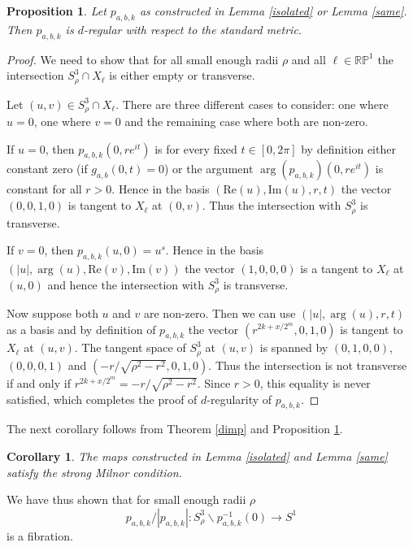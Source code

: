 \documentclass[notitlepage,12pt]{revtex4-1}
\newtheorem{corollary}[theorem]{\bf Corollary}
\newtheorem{proposition}[theorem]{\bf Proposition}
\begin{document}
\begin{proposition}
\label{trans}
Let $p_{a,b,k}$ as constructed in Lemma \ref{isolated} or Lemma \ref{same}. Then $p_{a,b,k}$ is $d$-regular with respect to the standard metric.
\end{proposition}

\begin{proof}
We need to show that for all small enough radii $\rho$ and all $\ell\in\mathbb{RP}^1$ the intersection $S^{3}_{\rho}\cap X_{\ell}$ is either empty or transverse.

Let $(u,v)\in S^{3}_{\rho}\cap X_{\ell}$. There are three different cases to consider: one where $u=0$, one where $v=0$ and the remaining case where both are non-zero.

If $u=0$, then $p_{a,b,k}(0,re^{it})$ is for every fixed $t\in[0,2\pi]$ by definition either constant zero (if $g_{a,b}(0,t)=0$) or the argument $\arg(p_{a,b,k})(0,re^{it})$ is constant for all $r>0$. Hence in the basis $(\mathrm{Re}(u),\mathrm{Im}(u),r,t)$ the vector $(0,0,1,0)$ is tangent to $X_{\ell}$ at $(0,v)$. Thus the intersection with $S^{3}_{\rho}$ is transverse.

If $v=0$, then $p_{a,b,k}(u,0)=u^s$. Hence in the basis $(|u|,\arg(u),\mathrm{Re}(v),\mathrm{Im}(v))$ the vector $(1,0,0,0)$ is a tangent to $X_{\ell}$ at $(u,0)$ and hence the intersection with $S^{3}_{\rho}$ is transverse.

Now suppose both $u$ and $v$ are non-zero. Then we can use $(|u|,\arg(u),r,t)$ as a basis and by definition of $p_{a,b,k}$ the vector $(r^{2k+x/2^m},0,1,0)$ is tangent to $X_{\ell}$ at $(u,v)$. The tangent space of $S^{3}_{\rho}$ at $(u,v)$ is spanned by $(0,1,0,0)$, $(0,0,0,1)$ and $(-r/\sqrt{\rho^2-r^2},0,1,0)$. Thus the intersection is not transverse if and only if $r^{2k+x/2^m}=-r/\sqrt{\rho^2-r^2}$. Since $r>0$, this equality is never satisfied, which completes the proof of $d$-regularity of $p_{a,b,k}$.
\end{proof}

The next corollary follows from Theorem \ref{dimp} and Proposition \ref{trans}.

\begin{corollary}
The maps constructed in Lemma \ref{isolated} and Lemma \ref{same} satisfy the strong Milnor condition.
\end{corollary}

We have thus shown that for small enough radii $\rho$
\begin{equation}
p_{a,b,k}/|p_{a,b,k}|:S^{3}_{\rho}\backslash p_{a,b,k}^{-1}(0)\to S^1
\end{equation}
is a fibration. 
\end{document}
